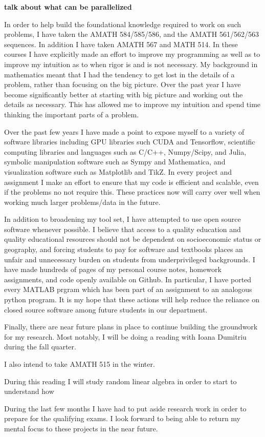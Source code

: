 \documentclass[11pt]{article}
\begin{document}
\textbf{talk about what can be parallelized}






In order to help build the foundational knowledge required to work on such problems, I have taken the AMATH 584/585/586, and the AMATH 561/562/563 sequences. In addition I have taken AMATH 567 and MATH 514. In these courses I have explicitly made an effort to improve my programming as well as to improve my intuition as to when rigor is and is not necessary. My background in mathematics meant that I had the tendency to get lost in the details of a problem, rather than focusing on the big picture. Over the past year I have become significantly better at starting with big picture and working out the details as necessary. This has allowed me to improve my intuition and spend time thinking the important parts of a problem.

Over the past few years I have made a point to expose myself to a variety of software libraries including GPU libraries such CUDA and Tensorflow, scientific computing libraries and languages such as C/C++, Numpy/Scipy, and Julia, symbolic manipulation software such as Sympy and Mathematica, and visualization software such as Matplotlib and TikZ. In every project and assignment I make an effort to ensure that my code is efficient and scalable, even if the problems no not require this. These practices now will carry over well when working much larger problems/data in the future.

In addition to broadening my tool set, I have attempted to use open source software whenever possible. I believe that access to a quality education and quality educational resources should not be dependent on socioeconomic status or geography, and forcing students to pay for software and textbooks places an unfair and unnecessary burden on students from underprivileged backgrounds. 
I have made hundreds of pages of my personal course notes, homework assignments, and code openly available on Github. In particular, I have ported every MATLAB prgram which has been part of an assignment to an analogous python program. It is my hope that these actions will help reduce the reliance on closed source software among future students in our department.


Finally, there are near future plans in place to continue building the groundwork for my research. Most notably, I will be doing a reading with Ioana Dumitriu during the fall quarter. 


I also intend to take AMATH 515 in the winter.

During this reading I will study random linear algebra in order to start to understand how 

During the last few months I have had to put aside research work in order to prepare for the qualifying exams. I look forward to being able to return my mental focus to these projects in the near future. 





\end{document}
